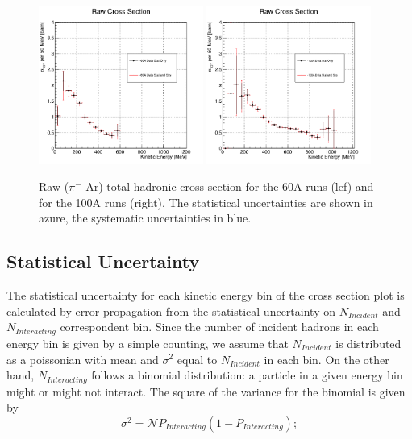 \begin{figure}
\centering  
\includegraphics[width=0.48\textwidth]{Chapter-6/Images/Plots60A.png}
\includegraphics[width=0.48\textwidth]{Chapter-6/Images/Plots100A.png}
\caption{Raw ($\pi^-$-Ar) total hadronic cross section for the 60A runs (lef) and for the 100A runs (right). The statistical uncertainties are shown in azure, the systematic uncertainties in blue.}
\label{fig:XSRaw}
\end{figure}


\subsection{Statistical Uncertainty}\label{ch:StatUncertaintyXSRaw}
The statistical uncertainty for each kinetic energy bin of the cross section plot is calculated by error propagation from the statistical uncertainty on $N_{Incident}$ and $N_{Interacting}$ correspondent bin.  Since the number of incident hadrons in each energy bin is given by a simple counting, we assume that $N_{Incident}$ is distributed as a poissonian with mean and $\sigma^2$ equal to $N_{Incident}$ in each bin.  
On the other hand, $N_{Interacting}$ follows a binomial distribution: a particle in a given energy bin might or might not interact.  The square of the variance for the binomial is given by  
\begin{equation}
\sigma^2 = \mathcal{N}P_{Interacting}(1-P_{Interacting});
\label{eq:binVar}
\end{equation}

